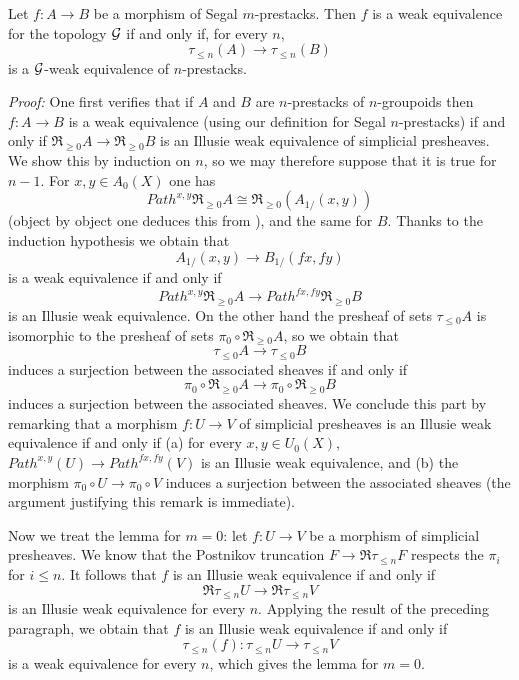 \begin{lemma}
\label{compatible}
Let $f:A\rightarrow B$ be a morphism of Segal $m$-prestacks. Then
$f$ is a weak equivalence for the topology ${\cal G}$ if and only if,
for every $n$,
$$
\tau _{\leq n} (A)\rightarrow
\tau _{\leq n} (B)
$$
is a ${\cal G}$-weak equivalence of $n$-prestacks.
\end{lemma}
{\em Proof:}
One first verifies that if $A$ and $B$ are $n$-prestacks of
$n$-groupoids
then $f:A\rightarrow B$ is a weak equivalence (using our
definition for Segal $n$-prestacks) if and only if $\Re
_{\geq 0} A
\rightarrow \Re _{\geq 0}B$ is an Illusie weak equivalence of
simplicial presheaves. We show this by induction on $n$, so we may
therefore suppose that it is true for $n-1$. For $x,y\in A_0(X)$ one has
$$
Path ^{x,y} \Re _{\geq 0} A \cong \Re _{\geq 0} (A_{1/}(x,y))
$$
(object by object one deduces this from \cite{Tamsamani}), and the same for
$B$. Thanks to the induction hypothesis we obtain that
$$
A_{1/}(x,y) \rightarrow B_{1/}(fx,fy)
$$
is a weak equivalence if and only if
$$
Path ^{x,y} \Re _{\geq 0} A \rightarrow Path ^{fx,fy} \Re _{\geq 0} B
$$
is an Illusie weak equivalence. On the other hand the presheaf
of sets
$\tau _{\leq 0} A$ is isomorphic to the presheaf of sets $\pi _0\circ
\Re _{\geq 0} A$, so we obtain that
$$
\tau _{\leq 0} A\rightarrow \tau _{\leq 0} B
$$
induces a surjection between the associated sheaves if and only if
$$
\pi _0\circ
\Re _{\geq 0} A\rightarrow \pi _0\circ
\Re _{\geq 0} B
$$
induces a surjection between the associated sheaves.
We conclude this part by remarking that a morphism $f:U\rightarrow V$ of
simplicial presheaves is an Illusie weak equivalence if and only
if (a) for every $x,y\in U_0(X)$, $Path ^{x,y}(U)\rightarrow Path^{fx,fy}(V)$
is an Illusie weak equivalence, and (b) the morphism $\pi _0\circ
U\rightarrow \pi _0\circ V$ induces a surjection between the associated sheaves
(the argument justifying this remark is immediate).

Now we treat the lemma for $m=0$: let $f: U\rightarrow V$ be a morphism
of simplicial presheaves. We know that the Postnikov truncation
$F \rightarrow\Re \tau _{\leq n}F$ respects
the $\pi _i$ for $i\leq n$. It follows that $f$ is an Illusie weak
equivalence if and only if
$$
\Re \tau _{\leq n}U\rightarrow \Re \tau _{\leq n}V
$$
is an Illusie weak equivalence for every $n$. Applying the
result of the preceding paragraph, we obtain that $f$ is
an Illusie weak equivalence
if and only if
$$
\tau _{\leq n}(f):\tau _{\leq n}U\rightarrow  \tau _{\leq
n}V
$$
is a weak equivalence for every $n$, which gives the lemma for $m=0$.

